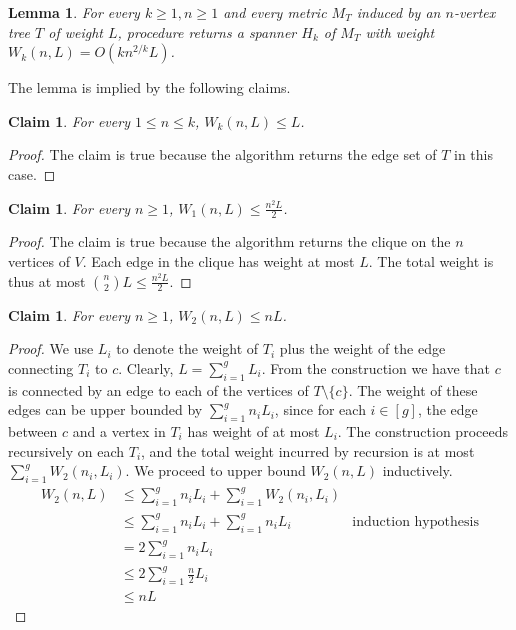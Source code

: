 \documentclass[11pt,english]{article}
\newtheorem{lemma}[theorem]{Lemma}
\newtheorem{claim}[theorem]{Claim}
\begin{document}
\begin{lemma}\label{lem:light}
For every $k \ge 1, n \ge 1$ and every metric $M_T$ induced by an $n$-vertex tree $T$ of weight $L$, procedure  returns a spanner $H_k$ of $M_T$ with weight $W_k(n, L) = O(kn^{2/k}L)$.
\end{lemma}
The lemma is implied by the following claims.

\begin{claim}\label{clm:ub:n-leq-k}
For every $1 \le n \le k$, $W_k(n, L) \le L$.
\end{claim}
\begin{proof}
The claim is true because the algorithm returns the edge set of $T$ in this case.
\end{proof}

\begin{claim}
For every $n \ge 1$, $W_1(n, L) \le \frac{n^2L}{2}$.
\end{claim}
\begin{proof}
The claim is true because the algorithm returns the clique on the $n$ vertices of $V$. Each edge in the clique has weight at most $L$. The total weight is thus at most $\binom{n}{2}L \le \frac{n^2L}{2}$.
\end{proof}

\begin{claim}
For every $n \ge 1$, $W_2(n, L) \le  nL$.
\end{claim}
\begin{proof}
We use $L_i$ to denote the weight of $T_i$ plus the weight of the edge connecting $T_i$ to $c$.
Clearly, $L = \sum_{i=1}^{g}L_i$. 
From the construction we have that $c$ is connected by an edge to each of the vertices of $T \setminus \{c\}$. The weight of these edges can be upper bounded by $\sum_{i=1}^{g}n_iL_i$, since for each $i \in [g]$, the edge between $c$ and a vertex in $T_i$ has weight of at most $L_i$. The construction proceeds recursively on each $T_i$, and the total weight incurred by recursion is at most $\sum_{i=1}^{g}W_2(n_i, L_i)$. We proceed to upper bound $W_2(n,L)$ inductively. 
\begin{align*}
W_2(n, L) &\le \sum_{i=1}^{g}n_iL_i + \sum_{i=1}^{g}W_2(n_i, L_i)  \\
&\le \sum_{i=1}^{g}n_iL_i + \sum_{i=1}^{g}n_iL_i & \text{induction hypothesis}\\
&= 2\sum_{i=1}^{g}n_iL_i \\
&\le 2\sum_{i=1}^{g}\frac{n}{2}L_i\\
&\le nL
\end{align*}
\end{proof}
\end{document}
